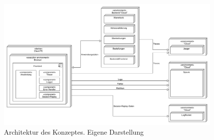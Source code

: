 \begin{figure}[H]
	\centering
	\includegraphics[width=\linewidth]{img/04_erstellung-poc/konzept.png}
	\caption{Architektur des Konzeptes. Eigene Darstellung}
	\label{fig:konzept}
\end{figure}